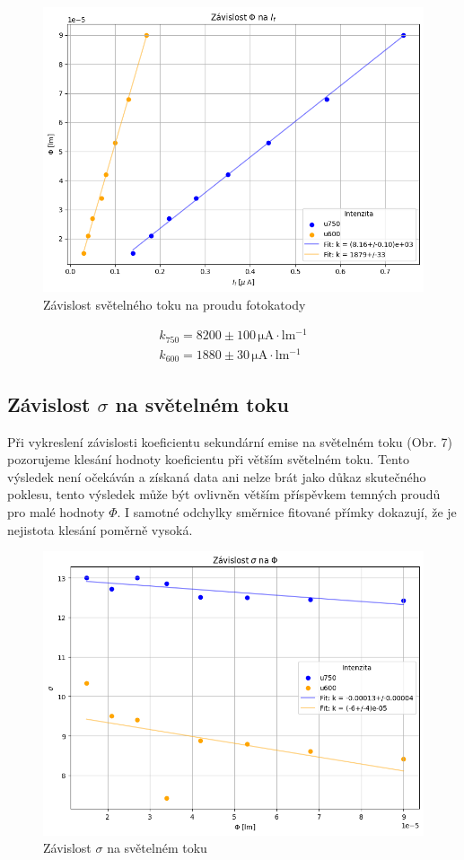 \documentclass[czech,11pt,a4paper]{article}
\begin{document}
\begin{multicols}{2}
		\begin{figure}[H]
			\centering
			\includegraphics[width=0.9\linewidth]{fig4}
			\caption{Závislost světelného toku na proudu fotokatody}
			
		\end{figure}
		\begin{gather*}
			k_{750} = 8200 \pm 100 \,\mathrm{\mu A \cdot lm ^{-1}}\\
			k_{600} = 1880 \pm 30 \,\mathrm{\mu A \cdot lm ^{-1}}
		\end{gather*}
		
		\subsection{Závislost $\sigma$ na světelném toku}
		Při vykreslení závislosti koeficientu sekundární emise na světelném toku (Obr. 7) pozorujeme klesání hodnoty koeficientu při větším světelném toku. Tento výsledek není očekáván a získaná data ani nelze brát jako důkaz skutečného poklesu, tento výsledek může být ovlivněn větším příspěvkem temných proudů pro malé hodnoty $\Phi$. I samotné odchylky směrnice fitované přímky dokazují, že je nejistota klesání poměrně vysoká.
			\begin{figure}[H]
			\centering
			\includegraphics[width=0.9\linewidth]{fit5}
			\caption{Závislost $\sigma$ na světelném toku}
			

\end{figure}
\end{multicols}
\end{document}
